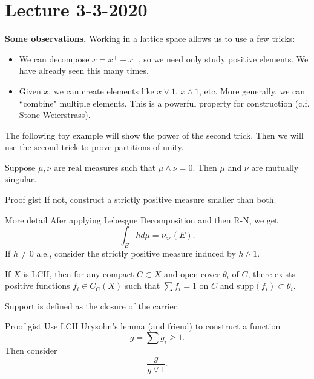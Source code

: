 \section{Lecture 3-3-2020}
\textbf{Some observations.} Working in a lattice space allows us to use a few tricks:
\begin{itemize}
    \item We can decompose $x = x^+ - x^-$, so we need only study positive elements. We have already seen this many times.
    \item Given $x$, we can create elements like $x \vee 1$, $x \wedge 1$, etc. More generally, we can ``combine" multiple elements. This is a powerful property for construction (c.f. Stone Weierstrass).
\end{itemize}
The following toy example will show the power of the second trick. Then we will use the second trick to prove partitions of unity.

\begin{thm}
Suppose $\mu, \nu$ are real measures such that $\mu \wedge \nu = 0$. Then $\mu$ and $\nu$ are mutually singular.
\end{thm}

\begin{details}{Proof gist}
If not, construct a strictly positive measure smaller than both.
\end{details}

\begin{details}{More detail}
Afer applying Lebesgue Decomposition and then R-N, we get
\[
    \int_E h d\mu = \nu_{ac}(E).
\]
If $h \neq 0$ a.e., consider the strictly positive measure induced by $h \wedge 1$.
\end{details}

\begin{thm}
If $X$ is LCH, then for any compact $C \subset X$ and open cover $\theta_i$ of $C$, there exists positive functions $f_i \in C_C(X)$ such that $\sum f_i = 1$ on $C$ and supp$(f_i) \subset \theta_i$.
\end{thm}
\begin{remark}
Support is defined as the closure of the carrier.
\end{remark}
\begin{details}{Proof gist}
Use LCH Urysohn's lemma (and friend) to construct a function
\[
    g = \sum g_i \geq 1.
\]
Then consider
\[
    \frac{g}{g \vee 1}.
\]
\end{details}

